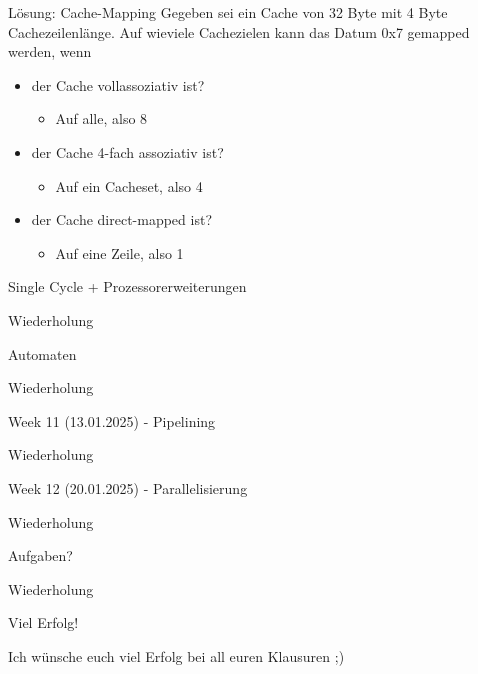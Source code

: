 \documentclass[
  german,            %
  aspectratio=169,    %
]{tumbeamer}
\begin{document}
\begin{frame}[c]{Lösung: Cache-Mapping}{}
	Gegeben sei ein Cache von 32 Byte mit 4 Byte Cachezeilenlänge. Auf wieviele Cachezielen kann das Datum 0x7 gemapped werden, wenn
	\vspace{0.5cm}
	\begin{itemize}
		\item der Cache vollassoziativ ist?
		\begin{itemize}
			\item Auf alle, also 8
		\end{itemize}
		\item der Cache 4-fach assoziativ ist?
		\begin{itemize}
			\item Auf ein Cacheset, also 4
		\end{itemize}
		\item der Cache direct-mapped ist?
		\begin{itemize}
			\item Auf eine Zeile, also 1
		\end{itemize}
	\end{itemize}
\end{frame}

\begin{frame}[c]{Single Cycle + Prozessorerweiterungen}{}
	\begin{center}
	  \LARGE Wiederholung
	\end{center}
\end{frame}

\begin{frame}[c]{Automaten}{}
	\begin{center}
	  \LARGE Wiederholung
	\end{center}
\end{frame}

\begin{frame}[c]{Week 11 (13.01.2025) - Pipelining}{}
	\begin{center}
	  \LARGE Wiederholung
	\end{center}
\end{frame}

\begin{frame}[c]{Week 12 (20.01.2025) - Parallelisierung}{}
	\begin{center}
	  \LARGE Wiederholung
	\end{center}
\end{frame}

\begin{frame}[c]{Aufgaben?}{}
	\begin{center}
	  \LARGE Wiederholung
	\end{center}
\end{frame}

\begin{frame}[c]{Viel Erfolg!}{}
  \begin{center}
	\LARGE Ich wünsche euch viel Erfolg bei all euren Klausuren ;)
  \end{center}
\end{frame}
\end{document}
